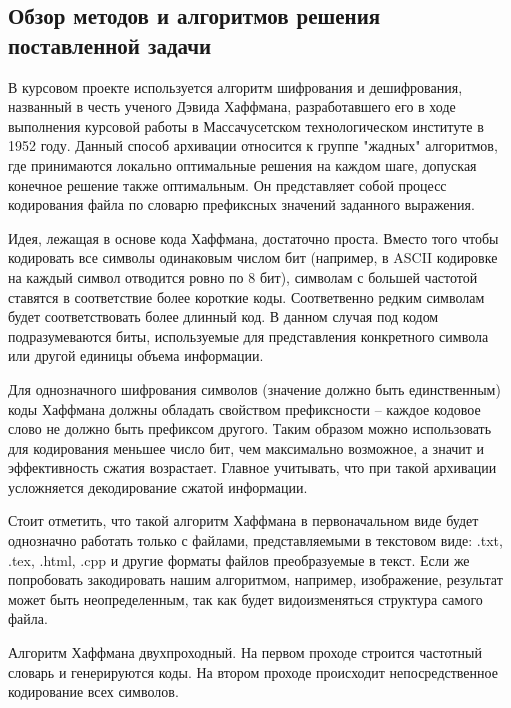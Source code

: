 \subsection{Обзор методов и алгоритмов решения поставленной задачи}

В курсовом проекте используется алгоритм шифрования и дешифрования, названный в честь ученого Дэвида Хаффмана, разработавшего его в ходе выполнения курсовой работы в Массачусетском технологическом институте в 1952 году.
Данный способ архивации относится к группе "жадных" алгоритмов, где принимаются локально оптимальные решения на каждом шаге, допуская конечное решение также оптимальным.
Он представляет собой процесс кодирования файла по словарю префиксных значений заданного выражения.



Идея, лежащая в основе кода Хаффмана\cite{wiki_huf}, достаточно проста. 
Вместо того чтобы кодировать все символы одинаковым числом бит (например, в ASCII кодировке на каждый символ отводится ровно по 8 бит), символам с большей частотой ставятся в соответствие более короткие коды.
Соответвенно редким символам будет соответствовать более длинный код.
В данном случая под кодом подразумеваются биты, используемые для представления конкретного символа или другой единицы объема информации.



Для однозначного шифрования символов (значение должно быть единственным) коды Хаффмана должны обладать свойством префиксности\cite{algo} -- каждое кодовое слово не должно быть префиксом другого.
Таким образом можно использовать для кодирования меньшее число бит, чем максимально возможное, а значит и эффективность сжатия возрастает.
Главное учитывать, что при такой архивации усложняется декодирование сжатой информации.



Стоит отметить, что такой алгоритм Хаффмана в первоначальном виде будет однозначно работать только с файлами, представляемыми в текстовом виде: .txt, .tex, .html, .cpp и другие форматы файлов преобразуемые в текст.
Если же попробовать закодировать нашим алгоритмом, например, изображение, результат может быть неопределенным, так как будет видоизменяться структура самого файла.



Алгоритм Хаффмана двухпроходный. На первом проходе строится частотный словарь и генерируются коды. 
На втором проходе происходит непосредственное кодирование всех символов.



